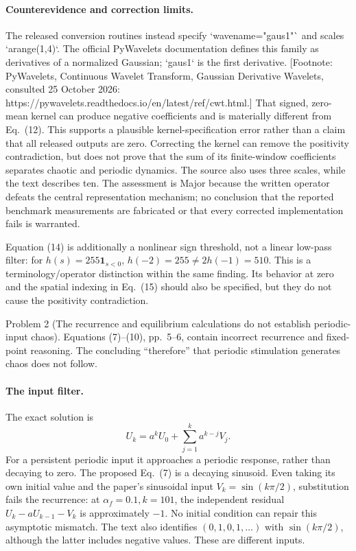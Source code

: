 \documentclass[10pt]{article}
\begin{document}
\paragraph*{Counterevidence and correction limits.}\mbox{}\par
The released conversion routines instead specify `wavename="gaus1"` and scales `arange(1,4)`. The official PyWavelets documentation defines this family as derivatives of a normalized Gaussian; `gaus1` is the first derivative. [Footnote: PyWavelets, Continuous Wavelet Transform, Gaussian Derivative Wavelets, consulted 25 October 2026: https://pywavelets.readthedocs.io/en/latest/ref/cwt.html.] That signed, zero-mean kernel can produce negative coefficients and is materially different from Eq. (12). This supports a plausible kernel-specification error rather than a claim that all released outputs are zero. Correcting the kernel can remove the positivity contradiction, but does not prove that the sum of its finite-window coefficients separates chaotic and periodic dynamics. The source also uses three scales, while the text describes ten. The assessment is Major because the written operator defeats the central representation mechanism; no conclusion that the reported benchmark measurements are fabricated or that every corrected implementation fails is warranted.\par
Equation (14) is additionally a nonlinear sign threshold, not a linear low-pass filter: for \(h(s)=255\mathbf{1}_{s<0}\), \(h(-2)=255\ne2h(-1)=510\). This is a terminology/operator distinction within the same finding. Its behavior at zero and the spatial indexing in Eq. (15) should also be specified, but they do not cause the positivity contradiction.\par
Problem 2 (The recurrence and equilibrium calculations do not establish periodic-input chaos).  Equations (7)–(10), pp. 5–6, contain incorrect recurrence and fixed-point reasoning. The concluding “therefore” that periodic stimulation generates chaos does not follow.\par
\paragraph*{The input filter.}\mbox{}\par
The exact solution is \[U_k=a^kU_0+\sum_{j=1}^k a^{k-j}V_j.\] For a persistent periodic input it approaches a periodic response, rather than decaying to zero. The proposed Eq. (7) is a decaying sinusoid. Even taking its own initial value and the paper’s sinusoidal input \(V_k=\sin(k\pi/2)\), substitution fails the recurrence: at \(\alpha_f=0.1,k=101\), the independent residual \(U_k-aU_{k-1}-V_k\) is approximately \(-1\). No initial condition can repair this asymptotic mismatch. The text also identifies \((0,1,0,1,\ldots)\) with \(\sin(k\pi/2)\), although the latter includes negative values. These are different inputs.\par
\end{document}
